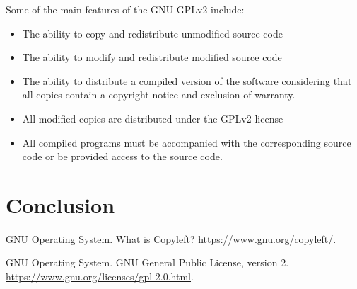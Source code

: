 \documentclass[12pt,letterpaper]{article}
\begin{document}
Some of the main features of the GNU GPLv2 include: \cite{gpl2}

\begin{itemize}
\item The ability to copy and redistribute unmodified source code
\item The ability to modify and redistribute modified source code
\item The ability to distribute a compiled version of the software considering that all copies contain a copyright notice and exclusion of warranty.
\item All modified copies are distributed under the GPLv2 license
\item All compiled programs must be accompanied with the corresponding source code or be provided access to the source code.
\end{itemize}

\section{Conclusion}

\newpage

\begin{thebibliography}{9}
 GNU Operating System. What is Copyleft? \url{https://www.gnu.org/copyleft/}.

 GNU Operating System. GNU General Public License, version 2. \url{https://www.gnu.org/licenses/gpl-2.0.html}.

\end{thebibliography}





\end{document}
